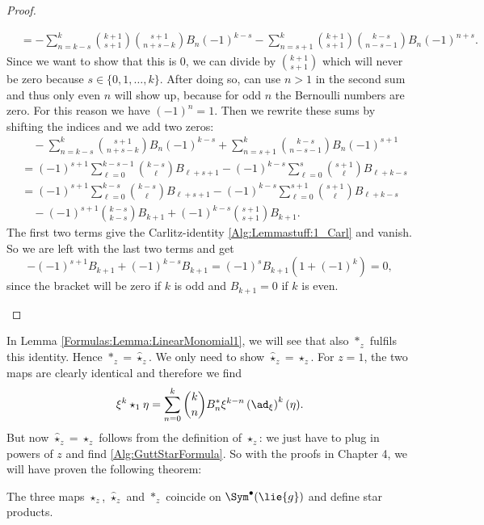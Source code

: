\begin{proof}
\begin{subproof}
\begin{enumerate}[(i)]
\begin{align*}
				& = 
				- \sum\limits_{n=k-s}^k 
				\binom{k+1}{s+1} \binom{s+1}{n+s-k} B_n (-1)^{k-s}
				- \sum\limits_{n=s+1}^k
				\binom{k+1}{s+1} \binom{k-s}{n-s-1} B_n (-1)^{n+s}.
			\end{align*}
			Since we want to show that this is $0$, we can divide by
			$\binom{k+1}{s+1}$ which will never be zero because 
			$s \in \{0, 1, \ldots, k\}$. After doing so, can use $n > 1$ in 
			the second sum and thus only even $n$ will show up, because for 
			odd $n$ the Bernoulli numbers are zero. For this reason we have 
			$(-1)^n = 1$. Then we rewrite these sums by shifting the indices 
			and we add two zeros:
			\begin{align*}
				& \quad
				- \sum\limits_{n=k-s}^k
				\binom{s+1}{n+s-k} B_n (-1)^{k-s}
				+ \sum\limits_{n=s+1}^k
				\binom{k-s}{n-s-1} B_n (-1)^{s+1} \\
				& =
				(-1)^{s+1} \sum\limits_{\ell=0}^{k-s-1}
				\binom{k-s}{\ell} B_{\ell+s+1}
				- (-1)^{k-s}\sum\limits_{\ell=0}^s 
				\binom{s+1}{\ell} B_{\ell + k - s} \\
				& =
				(-1)^{s+1} \sum\limits_{\ell=0}^{k-s}
				\binom{k-s}{\ell} B_{\ell+s+1}
				- (-1)^{k-s} \sum\limits_{\ell=0}^{s+1}
				\binom{s+1}{\ell} B_{\ell + k - s}\\
				& \quad
				- (-1)^{s+1} \binom{k-s}{k-s} B_{k+1} 
				+ (-1)^{k-s} \binom{s+1}{s+1} B_{k+1}.
			\end{align*}
			The first two terms give the Carlitz-identity 
			\eqref{Alg:Lemmastuff:1_Carl} and vanish. So we are left with 
			the last two terms and get
			\begin{equation*}
				- (-1)^{s+1} B_{k+1} + (-1)^{k-s} B_{k+1}
				=
				(-1)^s B_{k+1} \left(1 + (-1)^k\right) = 0,
			\end{equation*}
			since the bracket will be zero if $k$ is odd and $B_{k+1}=0$ if 
			$k$ is even.
		\end{enumerate}
	\end{subproof}
\end{proof}
In Lemma \ref{Formulas:Lemma:LinearMonomial1}, we will see that also	$\ast_z$ 
fulfils this identity. Hence $\ast_z = \widehat{\star}_z$. We only need to 
show $\widehat{\star}_z = \star_z$. For $z = 1$, the two 	maps are clearly 
identical and therefore we find
\begin{equation*}
	\xi^k \star_1 \eta
	=
	\sum\limits_{n=0}^k
	\binom{k}{n} B_n^* \xi^{k-n}
	\left( \ad_{\xi} \right)^k(\eta).
\end{equation*}
But now $\widehat{\star}_z = \star_z$ follows from the definition of $\star_z$: 
we just have to plug in powers of $z$ and find \eqref{Alg:GuttStarFormula}. 
So with the proofs in Chapter 4, we will have proven the following theorem:
\begin{theorem}
	\label{Alg:Thm:ThreeStarsAreOne}
	The three maps $\star_z$, $\widehat{\star}_z$ and $\ast_z$ 
	coincide on $\Sym^{\bullet}(\lie{g})$ and define star products.
\end{theorem}

